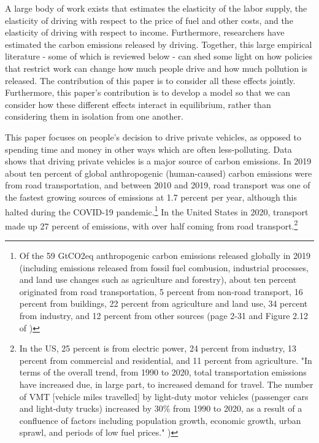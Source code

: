 \documentclass[letter, 12pt, epsf,leqno]{article}
\begin{document}
A large body of work exists that estimates the elasticity of the labor supply, the elasticity of driving with respect to the price of fuel and other costs, and the elasticity of driving with respect to income.  Furthermore, researchers have estimated the carbon emissions released by driving.  Together, this large empirical literature - some of which is reviewed below - can shed some light on how policies that restrict work can change how much people drive and how much pollution is released.  The contribution of this paper is to consider all these effects jointly.  Furthermore, this paper's contribution is to develop a model so that we can consider how these different effects interact in equilibrium, rather than considering them in isolation from one another.  

This paper focuses on people's decision to drive private vehicles, as opposed to spending time and money in other ways which are often less-polluting.  Data shows that driving private vehicles is a major source of carbon emissions.  In 2019 about ten percent of global anthropogenic (human-caused) carbon emissions were from road transportation, and between 2010 and 2019, road transport was one of the fastest growing sources of emissions at 1.7 percent per year, although this halted during the COVID-19 pandemic.\footnote{Of the 59 GtCO2eq anthropogenic carbon emissions released globally in 2019 (including emissions released from fossil fuel combusion, industrial processes, and land use changes such as agriculture and forestry), about ten percent originated from road transportation, 5 percent from non-road transport,  16 percent from buildings, 22 percent from agriculture and land use, 34 percent from industry, and 12 percent from other sources (page 2-31 and Figure 2.12 of \citet{ipcc2})}  In the United States in 2020, transport made up 27 percent of emissions, with over half coming from road transport.\footnote{In the US, 25 percent is from electric power, 24 percent from industry, 13 percent from commercial and residential, and 11 percent from agriculture.  "In terms of the overall trend, from 1990 to 2020, total transportation emissions have increased due, in large part, to increased demand for travel. The number of VMT [vehicle miles travelled] by light-duty motor vehicles (passenger cars and light-duty trucks) increased by 30\% from 1990 to 2020, as a result of a confluence of factors including population growth, economic growth, urban sprawl, and periods of low fuel prices." \citep{epa_sources})}
\end{document}
